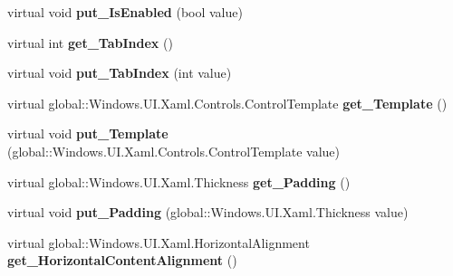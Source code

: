 \begin{DoxyCompactItemize}
virtual void {\bfseries put\+\_\+\+Is\+Enabled} (bool value)
\item 
\mbox{\label{class_windows_1_1_u_i_1_1_xaml_1_1_controls_1_1_control_a58eef00fd623bde61c10893d9205700b}} 
virtual int {\bfseries get\+\_\+\+Tab\+Index} ()
\item 
\mbox{\label{class_windows_1_1_u_i_1_1_xaml_1_1_controls_1_1_control_a8314612345a1e430bb7f8d51cdb9b131}} 
virtual void {\bfseries put\+\_\+\+Tab\+Index} (int value)
\item 
\mbox{\label{class_windows_1_1_u_i_1_1_xaml_1_1_controls_1_1_control_a2e40dea64382201f30a45dc2c9db69be}} 
virtual global\+::\+Windows.\+U\+I.\+Xaml.\+Controls.\+Control\+Template {\bfseries get\+\_\+\+Template} ()
\item 
\mbox{\label{class_windows_1_1_u_i_1_1_xaml_1_1_controls_1_1_control_adc937135b0249a6d3425011c1b394db2}} 
virtual void {\bfseries put\+\_\+\+Template} (global\+::\+Windows.\+U\+I.\+Xaml.\+Controls.\+Control\+Template value)
\item 
\mbox{\label{class_windows_1_1_u_i_1_1_xaml_1_1_controls_1_1_control_ae5ac1dbce8d9d993ed0c6ef90a22159d}} 
virtual global\+::\+Windows.\+U\+I.\+Xaml.\+Thickness {\bfseries get\+\_\+\+Padding} ()
\item 
\mbox{\label{class_windows_1_1_u_i_1_1_xaml_1_1_controls_1_1_control_a6898d6903b57a058dd5fb8ef28c5ec58}} 
virtual void {\bfseries put\+\_\+\+Padding} (global\+::\+Windows.\+U\+I.\+Xaml.\+Thickness value)
\item 
\mbox{\label{class_windows_1_1_u_i_1_1_xaml_1_1_controls_1_1_control_ab75bd10489d1a9f3060a3d3d8c060dbd}} 
virtual global\+::\+Windows.\+U\+I.\+Xaml.\+Horizontal\+Alignment {\bfseries get\+\_\+\+Horizontal\+Content\+Alignment} ()
\item 
\mbox{\label{class_windows_1_1_u_i_1_1_xaml_1_1_controls_1_1_control_a529faaf72afad384ebe1f02f4b794a09}} 

\end{DoxyCompactItemize}
